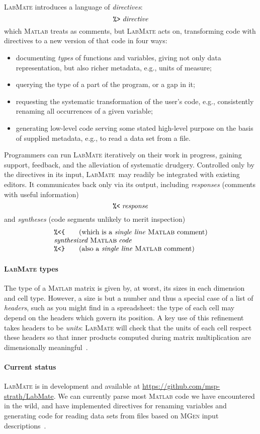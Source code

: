 \documentclass{ws-procs9x6}
\newcommand{\pct}{\texttt{\symbol{37}}}
\newcommand{\dir}{\texttt{\symbol{62}}}
\newcommand{\res}{\texttt{\symbol{60}}}
\newcommand{\lcb}{\texttt{\symbol{123}}}
\newcommand{\rcb}{\texttt{\symbol{125}}}
\newcommand{\lr}{\textsc{LabMate}}
\newcommand{\repo}{\url{https://github.com/msp-strath/LabMate}}
\newcommand{\ma}{\textsc{Matlab}}
\newcommand{\remph}{\emph}
\begin{document}
\lr{} introduces a language of \emph{directives}:
\[\pct\dir\;\mathit{directive}
\]
which \ma{} treats as comments, but \lr{} acts on, transforming code with directives to a new version of that code in four ways:
\begin{itemize}
\item documenting \remph{types} of functions and variables, giving not only data representation, but also richer metadata, e.g., units of measure;
\item querying the type of a part of the program, or a gap in it;
\item requesting the systematic transformation of the user's code, e.g., consistently renaming all occurrences of a given variable;
\item generating low-level code serving some stated high-level purpose on the basis of supplied metadata, e.g., to read a data set from a file.
\end{itemize}
Programmers can run \lr{} iteratively on their work in progress, gaining support, feedback, and the alleviation of systematic drudgery. Controlled only by the directives in its input, \lr\ may readily be integrated with existing editors. It communicates back only via its output, including \emph{responses} (comments with useful information)
\[
\pct\res\;\mathit{response}
\]
and \emph{syntheses} (code segments unlikely to merit inspection)
\[\begin{array}{l}
\pct\res\lcb\qquad \mbox{(which is a \remph{single line} \ma{} comment)}\\
\mathit{synthesized}\; \ma\;\mathit{code}\\
\pct\res\rcb\qquad \mbox{(also a \remph{single line} \ma{} comment)} \\
\end{array}\]

\paragraph{\lr{} types}

The type of a \ma{} matrix is given by, at worst, its sizes in each dimension and cell type. However, a size is but a number and thus a special case of a list of \remph{headers}, such as you might find in a spreadsheet: the type of each cell may depend on the headers which govern its position. A key use of this refinement takes headers to be \remph{units}: \lr{} will check that the units of each cell respect these headers so that inner products computed during matrix multiplication are dimensionally meaningful~\cite{dimTypes}.

\paragraph{Current status}

\lr{} is in development and available at \repo. We can currently parse most \ma{} code we have encountered in the wild, and have implemented directives for renaming variables and generating code for reading data sets from files based on \textsc{MGen} input descriptions~\cite{mgen}.



\end{document}

